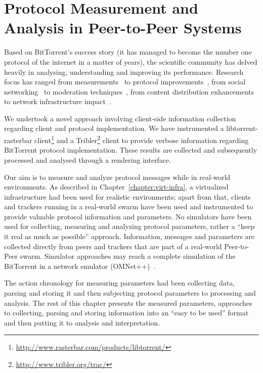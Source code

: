
\chapter{Protocol Measurement and Analysis in Peer-to-Peer Systems}
\label{chapter:proto-measure}

Based on BitTorrent's success story (it has managed to become the number one
protocol of the internet in a matter of years), the scientific community has
delved heavily in analysing, understanding and improving its performance.
Research focus has ranged from measurements~\cite{measurement-study} to
protocol improvements~\cite{bt-impr}, from social
networking~\cite{tribler-social} to moderation
techniques~\cite{measurements-analysis}, from content distribution
enhancements~\cite{bitos} to network infrastructure impact~\cite{bt-impact}.

We undertook a novel approach involving client-side information collection
regarding client and protocol implementation. We have instrumented a
libtorrent-rasterbar
client\footnote{\url{http://www.rasterbar.com/products/libtorrent/}} and a
Tribler\footnote{\url{http://www.tribler.org/trac/}} client to provide verbose
information regarding BitTorrent protocol implementation. These results are
collected and subsequently processed and analysed through a rendering
interface.

Our aim is to measure and analyze protocol messages while in real-world
environments. As described in Chapter~\ref{chapter:virt-infra}, a virtualized
infrastructure had been used for realistic environments; apart from that,
clients and trackers running in a real-world swarm have been used and
instrumented to provide valuable protocol information and parameters. No
simulators have been used for collecting, measuring and analyzing protocol
parameters, rather a ``keep it real as much as possible'' approach.
Information, messages and parameters are collected directly from peers and
trackers that are part of a real-world Peer-to-Peer swarm. Simulator
approaches may reach a complete simulation of the BitTorrent in a network
emulator (OMNet++)~\cite{simulating-bittorrent}.

The action chronology for measuring parameters had been collecting data,
parsing and storing it and then subjecting protocol parameters to processing
and analysis. The rest of this chapter presents the measured parameters,
approaches to collecting, parsing and storing information into an ``easy to be
used'' format and then putting it to analysis and interpretation.

